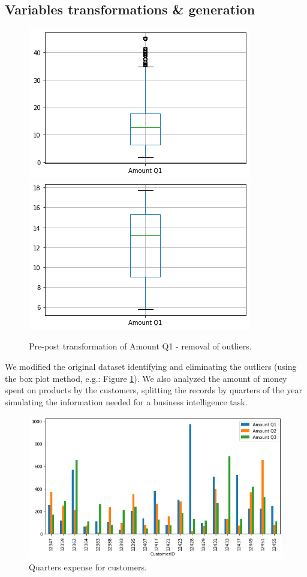 \documentclass[12pt]{article}
\begin{document}
\subsection{Variables transformations \& generation}
\begin{figure}[!h]
\centering
  \includegraphics[scale=0.4]{images/boxplotq1outliers.png}
\endminipage\hfill
{}
\centering
  \includegraphics[scale=0.4]{images/boxplotq1.png}
\endminipage\hfill
\caption{Pre-post transformation of Amount Q1 - removal of outliers.}
\label{fig:boxplotq1outliers}
\end{figure}
We modified the original dataset identifying and eliminating the outliers (using the box plot method, e.g.:  Figure \ref{fig:boxplotq1outliers}). We also analyzed the amount of money spent on products by the customers, splitting the records by quarters of the year simulating the information needed for a business intelligence task.
\begin{figure}[!ht]
    \centering
    \includegraphics[scale=0.4]{images/quarters.png}
    \caption{Quarters expense for customers.}
    \label{fig:quarters}
\end{figure}
\end{document}
